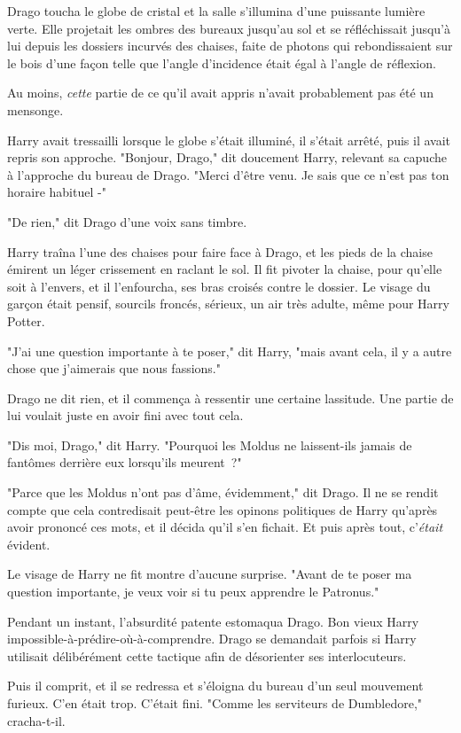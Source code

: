 Drago toucha le globe de cristal et la salle s'illumina d'une puissante lumière verte. Elle projetait les ombres des bureaux jusqu'au sol et se réfléchissait jusqu'à lui depuis les dossiers incurvés des chaises, faite de photons qui rebondissaient sur le bois d'une façon telle que l'angle d'incidence était égal à l'angle de réflexion.

Au moins, \emph{cette} partie de ce qu'il avait appris n'avait probablement pas été un mensonge.

Harry avait tressailli lorsque le globe s'était illuminé, il s'était arrêté, puis il avait repris son approche. "Bonjour, Drago," dit doucement Harry, relevant sa capuche à l'approche du bureau de Drago. "Merci d'être venu. Je sais que ce n'est pas ton horaire habituel -"

"De rien," dit Drago d'une voix sans timbre.

Harry traîna l'une des chaises pour faire face à Drago, et les pieds de la chaise émirent un léger crissement en raclant le sol. Il fit pivoter la chaise, pour qu'elle soit à l'envers, et il l'enfourcha, ses bras croisés contre le dossier. Le visage du garçon était pensif, sourcils froncés, sérieux, un air très adulte, même pour Harry Potter.

"J'ai une question importante à te poser," dit Harry, "mais avant cela, il y a autre chose que j'aimerais que nous fassions."

Drago ne dit rien, et il commença à ressentir une certaine lassitude. Une partie de lui voulait juste en avoir fini avec tout cela.

"Dis moi, Drago," dit Harry. "Pourquoi les Moldus ne laissent-ils jamais de fantômes derrière eux lorsqu'ils meurent~?"

"Parce que les Moldus n'ont pas d'âme, évidemment," dit Drago. Il ne se rendit compte que cela contredisait peut-être les opinons politiques de Harry qu'après avoir prononcé ces mots, et il décida qu'il s'en fichait. Et puis après tout, c'\emph{était} évident.

Le visage de Harry ne fit montre d'aucune surprise. "Avant de te poser ma question importante, je veux voir si tu peux apprendre le Patronus."

Pendant un instant, l'absurdité patente estomaqua Drago. Bon vieux Harry impossible-à-prédire-où-à-comprendre. Drago se demandait parfois si Harry utilisait délibérément cette tactique afin de désorienter ses interlocuteurs.

Puis il comprit, et il se redressa et s'éloigna du bureau d'un seul mouvement furieux. C'en était trop. C'était fini. "Comme les serviteurs de Dumbledore," cracha-t-il.


